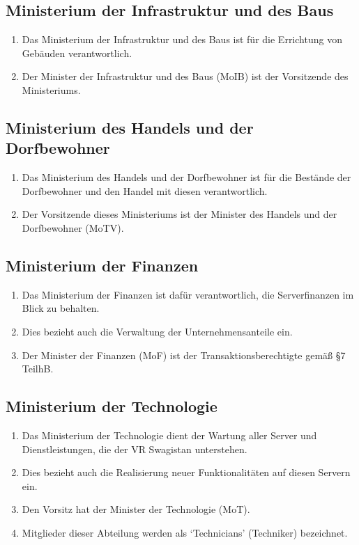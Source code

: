 \documentclass{article}
\begin{document}
\subsection{Ministerium der Infrastruktur und des Baus}
\begin{enumerate}[(1)]
    \item Das Ministerium der Infrastruktur und des Baus ist für die Errichtung von Gebäuden verantwortlich.
    \item Der Minister der Infrastruktur und des Baus (MoIB) ist der Vorsitzende des Ministeriums.
\end{enumerate}

\subsection{Ministerium des Handels und der Dorfbewohner}
\begin{enumerate}[(1)]
    \item Das Ministerium des Handels und der Dorfbewohner ist für die Bestände der Dorfbewohner und den Handel mit diesen verantwortlich.
    \item Der Vorsitzende dieses Ministeriums ist der Minister des Handels und der Dorfbewohner (MoTV).
\end{enumerate}

\subsection{Ministerium der Finanzen}
\begin{enumerate}[(1)]
	\item Das Ministerium der Finanzen ist dafür verantwortlich, die Serverfinanzen im Blick zu behalten.
	\item Dies bezieht auch die Verwaltung der Unternehmensanteile ein.
	\item Der Minister der Finanzen (MoF) ist der Transaktionsberechtigte gemäß §7 TeilhB.
\end{enumerate}

\subsection{Ministerium der Technologie}
\begin{enumerate}[(1)]
	\item Das Ministerium der Technologie dient der Wartung aller Server und Dienstleistungen, die der VR Swagistan unterstehen.
	\item Dies bezieht auch die Realisierung neuer Funktionalitäten auf diesen Servern ein.
	\item Den Vorsitz hat der Minister der Technologie (MoT).
	\item Mitglieder dieser Abteilung werden als `Technicians' (Techniker) bezeichnet.
\end{enumerate}
\end{document}
